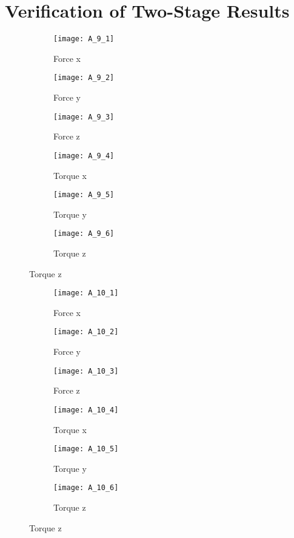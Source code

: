 \section*{Verification of Two-Stage Results}
\begin{figure}[H]
  \caption{Static contact force}
  \label{fig:appendix static contact}  
  \begin{subfigure}[t]{0.5\textwidth}
    \centering
    \texttt{[image: A\_9\_1]} 
    \caption{Force x}
  \end{subfigure}
  \begin{subfigure}[t]{0.5\textwidth}
    \centering
    \texttt{[image: A\_9\_2]}
    \caption{Force y}
  \end{subfigure}
  \begin{subfigure}[t]{0.5\textwidth}
    \centering
    \texttt{[image: A\_9\_3]}
    \caption{Force z}
  \end{subfigure}
  \begin{subfigure}[t]{0.5\textwidth}
    \centering
    \texttt{[image: A\_9\_4]}
    \caption{Torque x}
  \end{subfigure}
  \begin{subfigure}[t]{0.5\textwidth}
    \centering
    \texttt{[image: A\_9\_5]}
    \caption{Torque y}
  \end{subfigure}
  \begin{subfigure}[t]{0.5\textwidth}
    \centering
    \texttt{[image: A\_9\_6]}
    \caption{Torque z}
  \end{subfigure}
\end{figure}

\begin{figure}[H]
  \caption{Sinusoidal contact force}  
  \begin{subfigure}[t]{0.5\textwidth}
    \centering
    \texttt{[image: A\_10\_1]} 
    \caption{Force x}
  \end{subfigure}
  \begin{subfigure}[t]{0.5\textwidth}
    \centering
    \texttt{[image: A\_10\_2]}
    \caption{Force y}
  \end{subfigure}
  \begin{subfigure}[t]{0.5\textwidth}
    \centering
    \texttt{[image: A\_10\_3]}
    \caption{Force z}
  \end{subfigure}
  \begin{subfigure}[t]{0.5\textwidth}
    \centering
    \texttt{[image: A\_10\_4]}
    \caption{Torque x}
  \end{subfigure}
  \begin{subfigure}[t]{0.5\textwidth}
    \centering
    \texttt{[image: A\_10\_5]}
    \caption{Torque y}
  \end{subfigure}
  \begin{subfigure}[t]{0.5\textwidth}
    \centering
    \texttt{[image: A\_10\_6]}
    \caption{Torque z}
  \end{subfigure}
\end{figure}

